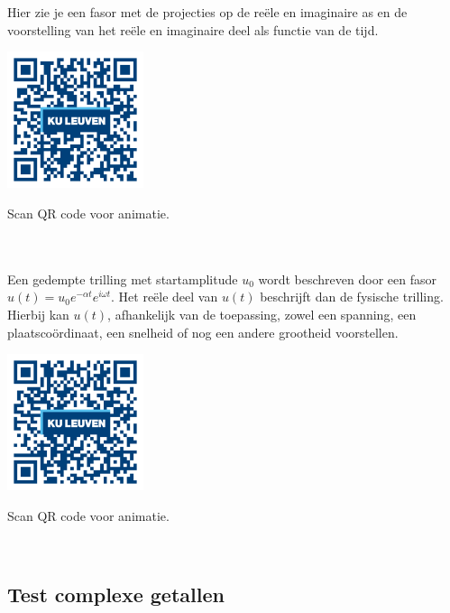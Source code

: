 Hier zie je een fasor met de projecties op de re\"{e}le en imaginaire as en de voorstelling van het re\"{e}le en imaginaire deel als functie van de tijd. \\


\begin{minipage}{.25\linewidth}
	\raggedright
	\includegraphics[width=4cm]{3_gonio_complexe_getallen/inputs/QR_Code_ANIMATIE6_module3new}
\end{minipage}
\begin{minipage}{.7\linewidth}
	Scan QR code voor animatie.
\end{minipage}    \\     \\

Een gedempte trilling met startamplitude $u_{0}$ wordt beschreven door een fasor $u(t)=u_{0}e^{-\alpha t}e^{i\omega t}$. Het re\"{e}le deel van $u(t)$ beschrijft dan de fysische trilling. Hierbij kan $u(t)$, afhankelijk van de toepassing, zowel een spanning, een plaatsco\"{o}rdinaat, een snelheid of nog een andere grootheid voorstellen.\\

\begin{minipage}{.25\linewidth}
	\raggedright
	\includegraphics[width=4cm]{3_gonio_complexe_getallen/inputs/QR_Code_ANIMATIE7_module3new}
\end{minipage}
\begin{minipage}{.7\linewidth}
	Scan QR code voor animatie.
\end{minipage}   \\

\subsection{Test complexe getallen}

